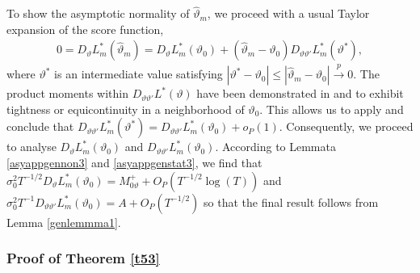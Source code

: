 {{To show the asymptotic normality of $\hat{\vartheta}_{m}$, we proceed with a usual Taylor expansion of the score function, 
\begin{align*}
    0 =  D_{\vartheta}L_{m}^*(\hat{\vartheta}_{m}) =  D_{\vartheta} L_{m}^*(\vartheta_0) + \left(\hat{\vartheta}_{m}-\vartheta_0\right)  D_{\vartheta \vartheta'} L_{m}^*(\vartheta^*),
\end{align*}
where $\vartheta^*$ is an intermediate value satisfying $|\vartheta^*-\vartheta_0| \leq |\hat{\vartheta}_{m} - \vartheta_0| \overset{p}{\rightarrow} 0$. The product moments within $D_{\vartheta \vartheta'}L^*(\vartheta)$ have been demonstrated in \textcite[Lemma C.4]{johansen2010likelihood} and \textcite[ Lemma A.8(i)]{johansen2012necessary} to exhibit tightness or equicontinuity in a neighborhood of $\vartheta_0$. This allows us to apply \textcite[Lemma A.3]{johansen2010likelihood} and conclude that $D_{\vartheta \vartheta'} L_{m}^*(\vartheta^*) = D_{\vartheta \vartheta'}L_{m}^*(\vartheta_0) + o_P(1)$. Consequently, we proceed to analyse $D_{\vartheta} L_{m}^*(\vartheta_0)$ and $D_{\vartheta \vartheta'}L_{m}^*(\vartheta_0)$. According to Lemmata \ref{asyappgennon3} and \ref{asyappgenstat3}, we find that $ \sigma^2_0 T^{-1/2}D_{\vartheta} L_{m}^*(\vartheta_0) =  M_{0\vartheta}^{+} + O_P(T^{-1/2}\log(T))$ and $ \sigma^2_0 T^{-1}D_{\vartheta \vartheta'}L_{m}^*(\vartheta_0) = A + O_P(T^{-1/2})$ so that the final result follows from Lemma \ref{genlemmma1}.  






\subsubsection{Proof of Theorem \ref{t53}} \label{proofthm53}

}}

